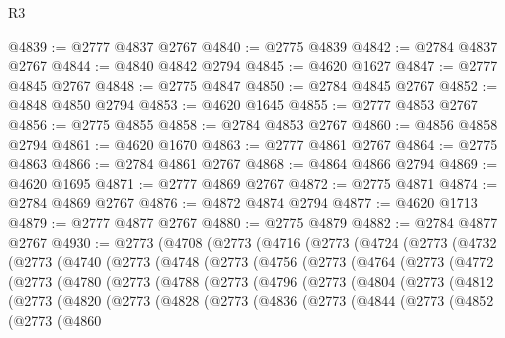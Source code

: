 \begin{lexlean}{R3}
\begin{coremodule}
@4839 := @2777 @4837 @2767
@4840 := @2775 @4839
@4842 := @2784 @4837 @2767
@4844 := @4840 @4842 @2794
@4845 := @4620 @1627
@4847 := @2777 @4845 @2767
@4848 := @2775 @4847
@4850 := @2784 @4845 @2767
@4852 := @4848 @4850 @2794
@4853 := @4620 @1645
@4855 := @2777 @4853 @2767
@4856 := @2775 @4855
@4858 := @2784 @4853 @2767
@4860 := @4856 @4858 @2794
@4861 := @4620 @1670
@4863 := @2777 @4861 @2767
@4864 := @2775 @4863
@4866 := @2784 @4861 @2767
@4868 := @4864 @4866 @2794
@4869 := @4620 @1695
@4871 := @2777 @4869 @2767
@4872 := @2775 @4871
@4874 := @2784 @4869 @2767
@4876 := @4872 @4874 @2794
@4877 := @4620 @1713
@4879 := @2777 @4877 @2767
@4880 := @2775 @4879
@4882 := @2784 @4877 @2767
@4930 := @2773
    (@4708
      (@2773
        (@4716
          (@2773
            (@4724
              (@2773
                (@4732
                  (@2773
                    (@4740
                      (@2773
                        (@4748
                          (@2773
                            (@4756
                              (@2773
                                (@4764
                                  (@2773
                                    (@4772
                                      (@2773
                                        (@4780
                                          (@2773
                                            (@4788
                                              (@2773
                                                (@4796
                                                  (@2773
                                                    (@4804
                                                      (@2773
                                                        (@4812
                                                          (@2773
                                                            (@4820
                                                              (@2773
                                                                (@4828
                                                                  (@2773
                                                                    (@4836
                                                                      (@2773
                                                                        (@4844
                                                                          (@2773
                                                                            (@4852
                                                                              (@2773
                                                                                (@4860

\end{coremodule}
\end{lexlean}
